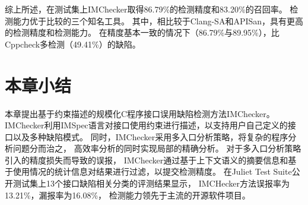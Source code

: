 综上所述，在测试集上IMChecker取得86.79\%的检测精度和83.20\%的召回率。
检测能力优于比较的三个知名工具。
其中，相比较于Clang-SA和APISan，具有更高的检测精度和检测能力。
在精度基本一致的情况下（86.79\%与89.95\%），比Cppcheck多检测（49.41\%）的缺陷。


\section{本章小结}
\label{sec:3.5}
本章提出基于约束描述的规模化C程序接口误用缺陷检测方法IMChecker。
IMChecker利用IMSpec语言对接口使用约束进行描述，以支持用户自己定义的接口以及多种缺陷模式。
同时，IMChecker采用多入口分析策略，将复杂的程序分析问题分而治之，
高效率分析的同时实现局部的精确分析。
对于多入口分析策略引入的精度损失而导致的误报，
IMChecker通过基于上下文语义的摘要信息和基于使用情况的统计信息对结果进行过滤，以提交检测精度。
在Juliet Test Suite公开测试集上13个接口缺陷相关分类的评测结果显示，
IMCHecker方法误报率为13.21\%，漏报率为16.08\%，
检测能力领先于主流的开源软件项目。
